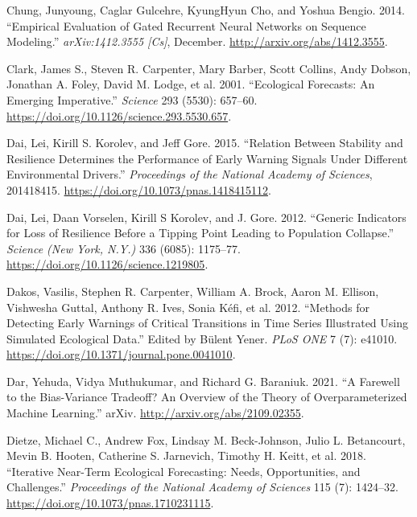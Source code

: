 \documentclass{article}
\newlength{\cslhangindent}
\newlength{\cslentryspacingunit} %
\newenvironment{CSLReferences}[2] %
 {%
  \setlength{\parindent}{0pt}
  \ifodd #1
  \let\oldpar\par
  \def\par{\hangindent=\cslhangindent\oldpar}
  \fi
  \setlength{\parskip}{#2\cslentryspacingunit}
 }%
 {}
\begin{document}
\begin{CSLReferences}{1}{0}
\leavevmode{}%
Chung, Junyoung, Caglar Gulcehre, KyungHyun Cho, and Yoshua Bengio.
2014. {``Empirical {Evaluation} of {Gated} {Recurrent} {Neural}
{Networks} on {Sequence} {Modeling}.''} \emph{arXiv:1412.3555 {[}Cs{]}},
December. \url{http://arxiv.org/abs/1412.3555}.

\leavevmode{}%
Clark, James S., Steven R. Carpenter, Mary Barber, Scott Collins, Andy
Dobson, Jonathan A. Foley, David M. Lodge, et al. 2001. {``Ecological
{Forecasts}: {An} {Emerging} {Imperative}.''} \emph{Science} 293 (5530):
657--60. \url{https://doi.org/10.1126/science.293.5530.657}.

\leavevmode{}%
Dai, Lei, Kirill S. Korolev, and Jeff Gore. 2015. {``Relation Between
Stability and Resilience Determines the Performance of Early Warning
Signals Under Different Environmental Drivers.''} \emph{Proceedings of
the National Academy of Sciences}, 201418415.
\url{https://doi.org/10.1073/pnas.1418415112}.

\leavevmode{}%
Dai, Lei, Daan Vorselen, Kirill S Korolev, and J. Gore. 2012. {``Generic
{Indicators} for {Loss} of {Resilience} {Before} a {Tipping} {Point}
{Leading} to {Population} {Collapse}.''} \emph{Science (New York, N.Y.)}
336 (6085): 1175--77. \url{https://doi.org/10.1126/science.1219805}.

\leavevmode{}%
Dakos, Vasilis, Stephen R. Carpenter, William A. Brock, Aaron M.
Ellison, Vishwesha Guttal, Anthony R. Ives, Sonia Kéfi, et al. 2012.
{``Methods for {Detecting} {Early} {Warnings} of {Critical}
{Transitions} in {Time} {Series} {Illustrated} {Using} {Simulated}
{Ecological} {Data}.''} Edited by Bülent Yener. \emph{PLoS ONE} 7 (7):
e41010. \url{https://doi.org/10.1371/journal.pone.0041010}.

\leavevmode{}%
Dar, Yehuda, Vidya Muthukumar, and Richard G. Baraniuk. 2021. {``A
{Farewell} to the {Bias}-{Variance} {Tradeoff}? {An} {Overview} of the
{Theory} of {Overparameterized} {Machine} {Learning}.''} arXiv.
\url{http://arxiv.org/abs/2109.02355}.

\leavevmode{}%
Dietze, Michael C., Andrew Fox, Lindsay M. Beck-Johnson, Julio L.
Betancourt, Mevin B. Hooten, Catherine S. Jarnevich, Timothy H. Keitt,
et al. 2018. {``Iterative Near-Term Ecological Forecasting: {Needs},
Opportunities, and Challenges.''} \emph{Proceedings of the National
Academy of Sciences} 115 (7): 1424--32.
\url{https://doi.org/10.1073/pnas.1710231115}.


\end{CSLReferences}
\end{document}
